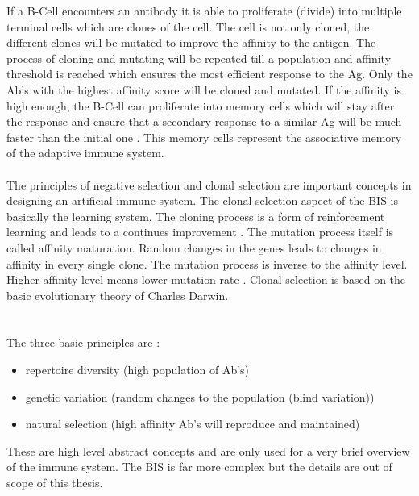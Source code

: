 If a B-Cell encounters an antibody it is able to proliferate (divide) into multiple terminal cells which are clones of the cell. The cell is not only cloned, the different clones will be mutated to improve the affinity to the antigen. The process of cloning and mutating will be repeated till a population and affinity threshold is reached which ensures the most efficient response to the Ag. Only the Ab’s with the highest affinity score will be cloned and mutated. If the affinity is high enough, the B-Cell can proliferate into memory cells which will stay after the response and ensure that a secondary response to a similar Ag will be much faster than the initial one \cite{DEC02}. This memory cells represent the associative memory of the adaptive immune system. 
\\\\
The principles of negative selection and clonal selection are important concepts in designing an artificial immune system. The clonal selection aspect of the BIS is basically the learning system. The cloning process is a form of reinforcement learning and leads to a continues improvement \cite{DEC02}.
The mutation process itself is called affinity maturation. Random changes in the genes leads to changes in affinity in every single clone. The mutation process is inverse to the affinity level. Higher affinity level means lower mutation rate \cite{DEC02}.  
Clonal selection is based on the basic evolutionary theory of Charles Darwin.\\\\\\ The three basic principles are \cite{DEC02}:
\\
\begin{itemize}
	\item 	repertoire diversity (high population of Ab’s)
	\item 	genetic variation (random changes to the population (blind variation))
	\item 	natural selection (high affinity Ab’s will reproduce and maintained) 
	
\end{itemize}

These are high level abstract concepts and are only used for a very brief overview of the immune system. The BIS is far more complex but the details are out of scope of this thesis.



